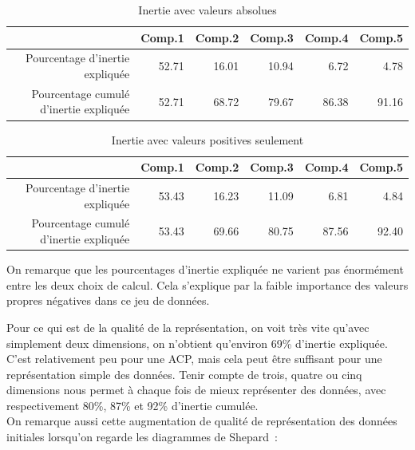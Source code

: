 \documentclass[a4paper,10pt]{report}
\begin{document}
\begin{table}[H]
	\centering
	\caption{Inertie avec valeurs absolues}
	\begin{tabular}{r|rrrrr}
		& Comp.1 & Comp.2 & Comp.3 & Comp.4 & Comp.5 \\ 
		\hline
		\small Pourcentage d'inertie expliquée & 52.71 & 16.01 & 10.94 & 6.72 & 4.78 \\ 
		\small Pourcentage cumulé d'inertie expliquée & 52.71 & 68.72 & 79.67 & 86.38 & 91.16 \\ 
	\end{tabular}
	\label{table:1-mut-acp-aftd-inertie-valeurs-absolues}
\end{table}

\begin{table}[H]
	\centering
	\caption{Inertie avec valeurs positives seulement}
	\begin{tabular}{r|rrrrr}
		& Comp.1 & Comp.2 & Comp.3 & Comp.4 & Comp.5 \\ 
		\hline
		\small Pourcentage d'inertie expliquée & 53.43 & 16.23 & 11.09 & 6.81 & 4.84 \\ 
		\small Pourcentage cumulé d'inertie expliquée & 53.43 & 69.66 & 80.75 & 87.56 & 92.40 \\ 
	\end{tabular}
	\label{table:1-mut-acp-aftd-inertie-valeurs-positives}
\end{table}

On remarque que les pourcentages d'inertie expliquée ne varient pas énormément entre les deux choix de calcul. Cela s'explique par la faible importance des valeurs propres négatives dans ce jeu de données.

Pour ce qui est de la qualité de la représentation, on voit très vite qu'avec simplement deux dimensions, on n'obtient qu'environ 69\% d'inertie expliquée. C'est relativement peu pour une ACP, mais cela peut être suffisant pour une représentation simple des données. Tenir compte de trois, quatre ou cinq dimensions nous permet à chaque fois de mieux représenter des données, avec respectivement 80\%, 87\% et 92\% d'inertie cumulée.\\

On remarque aussi cette augmentation de qualité de représentation des données initiales lorsqu'on regarde les diagrammes de Shepard~:
\end{document}
